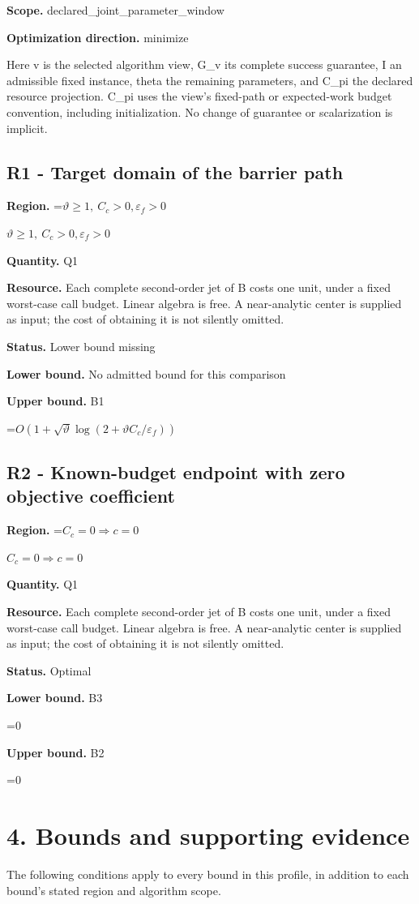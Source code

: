 \documentclass[10pt,a4paper]{article}
\newcommand{\AtlasMath}[1]{\par\begingroup\centering\setbox0=\hbox{$\displaystyle #1$}\ifdim\wd0>1.4\linewidth\typeout{ATLAS WIDE FORMULA: \the\wd0}\fi\ifdim\wd0>\linewidth\resizebox{\linewidth}{!}{\box0}\else\box0\fi\par\endgroup}
\newcommand{\AtlasInlineMath}[1]{\begingroup\setbox0=\hbox{$#1$}\ifdim\wd0>.4\linewidth\endgroup\AtlasMath{#1}\else\endgroup$#1$\fi}
\begin{document}
\textbf{Scope.} declared\_joint\_parameter\_window

\textbf{Optimization direction.} minimize

Here v is the selected algorithm view, G\_v its complete success guarantee, I an admissible fixed instance, theta the remaining parameters, and C\_pi the declared resource projection. C\_pi uses the view's fixed-path or expected-work budget convention, including initialization. No change of guarantee or scalarization is implicit.

\subsection{R1 - Target domain of the barrier path}
\textbf{Region.} \AtlasInlineMath{\vartheta\ge1,\ C_c>0,\varepsilon_f>0}

\textbf{Quantity.} Q1

\textbf{Resource.} Each complete second-order jet of B costs one unit, under a fixed worst-case call budget. Linear algebra is free. A near-analytic center is supplied as input; the cost of obtaining it is not silently omitted.

\textbf{Status.} Lower bound missing

\textbf{Lower bound.} No admitted bound for this comparison

\textbf{Upper bound.} B1

\AtlasMath{O(1+\sqrt\vartheta\log(2+\vartheta C_c/\varepsilon_f))}
\subsection{R2 - Known-budget endpoint with zero objective coefficient}
\textbf{Region.} \AtlasInlineMath{C_c=0\Rightarrow c=0}

\textbf{Quantity.} Q1

\textbf{Resource.} Each complete second-order jet of B costs one unit, under a fixed worst-case call budget. Linear algebra is free. A near-analytic center is supplied as input; the cost of obtaining it is not silently omitted.

\textbf{Status.} Optimal

\textbf{Lower bound.} B3

\AtlasMath{0}
\textbf{Upper bound.} B2

\AtlasMath{0}
\section{4. Bounds and supporting evidence}
The following conditions apply to every bound in this profile, in addition to each bound's stated region and algorithm scope.
\end{document}

